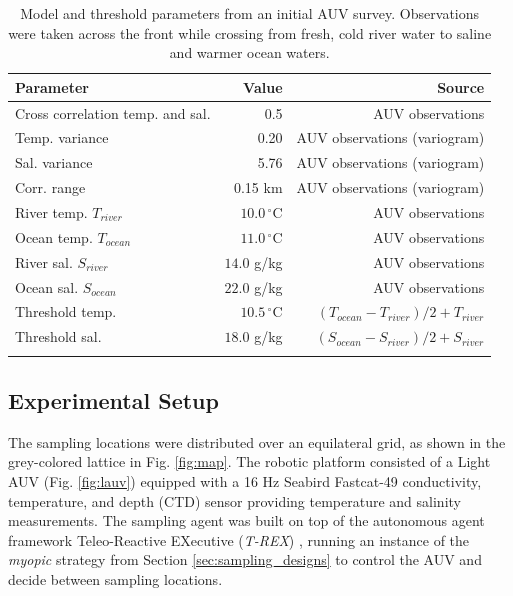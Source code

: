 \documentclass[aoas]{imsart}
\begin{document}
\begin{table}[!h]
\centering
\begin{tabular}{lrr}
\toprule
Parameter & Value & Source\\
\midrule
\rowcolor{Gray}
Cross correlation temp. and sal. & 0.5 & AUV observations\\
Temp. variance &  0.20 & AUV observations (variogram)\\
\rowcolor{Gray}
Sal. variance &  5.76 & AUV observations (variogram)\\
Corr. range  & 0.15 km & AUV observations (variogram)\\
\rowcolor{Gray}
River temp. $T_{river}$ & $10.0\,^{\circ}\mathrm{C}$ & AUV observations\\
Ocean temp. $T_{ocean}$ & $11.0\,^{\circ}\mathrm{C}$ & AUV observations\\
\rowcolor{Gray}
River sal. $S_{river}$ & $14.0$ g/kg & AUV observations\\
Ocean sal. $S_{ocean}$ & $22.0$ g/kg & AUV observations\\
\rowcolor{Gray}
Threshold temp. & $10.5\,^{\circ}\mathrm{C}$ & $(T_{ocean}-T_{river})/2+T_{river}$\\
Threshold sal. & $18.0$ g/kg & $(S_{ocean}-S_{river})/2+S_{river}$\\
\rowcolor{Gray}
\bottomrule
\end{tabular}
\caption{Model and threshold parameters from an initial AUV
  survey. Observations were taken across the front while crossing from
  fresh, cold river water to saline and warmer ocean waters.}
\label{tab:experiment_param}
\end{table}


\subsection{Experimental Setup}

The sampling locations were distributed over an equilateral grid, as
shown in the grey-colored lattice in Fig. \ref{fig:map}. The robotic
platform consisted of a Light AUV \citep{sousa2012lauv}
(Fig. \ref{fig:lauv}) equipped with a 16 Hz Seabird Fastcat-49
conductivity, temperature, and depth (CTD) sensor providing
temperature and salinity
measurements. %
The sampling agent was built on top of the autonomous agent framework
Teleo-Reactive EXecutive (\textit{T-REX})
\citep{py10,Rajan12,Rajan12b}, running an instance of the
\textit{myopic} strategy from Section \ref{sec:sampling_designs} to
control the AUV and decide between sampling locations.
\end{document}
